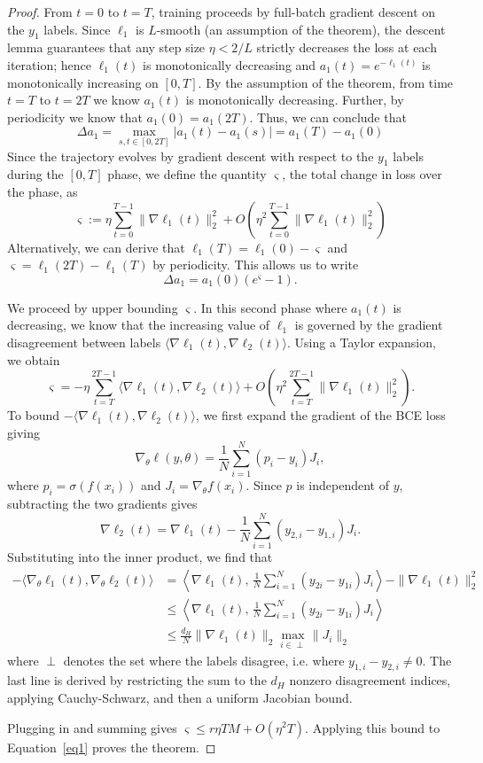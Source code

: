 \documentclass[pmlr]{jmlr} %
\begin{document}
\begin{proof}
From $t=0$ to $t=T$, training proceeds by full-batch gradient descent on the $y_1$ labels. Since $\ell_1$ is $L$-smooth (an assumption of the theorem), the descent lemma guarantees that any step size $\eta < 2/L$ strictly decreases the loss at each iteration; hence $\ell_1(t)$ is monotonically decreasing and $a_1(t)=e^{-\ell_1(t)}$ is monotonically increasing on $[0,T]$. By the assumption of the theorem, from time $t=T$ to $t=2T$ we know $a_1(t)$ is monotonically decreasing. Further, by periodicity we know that $a_1(0)=a_1(2T)$. Thus, we can conclude that
\[
    \Delta a_1 = \max_{s,t \in [0,2T]}|a_1(t)-a_1(s)|=a_1(T)-a_1(0)
\]
Since the trajectory evolves by gradient descent with respect to the $y_1$ labels during the $[0,T]$ phase, we define the quantity $\varsigma$, the total change in loss over the phase, as
\[
\varsigma := \eta \sum_{t=0}^{T-1}\|\nabla\ell_1(t)\|_2^2 + O\left( \eta^2 \sum_{t=0}^{T-1}\|\nabla\ell_1(t)\|_2^2 \right)
\]
Alternatively, we can derive that $\ell_1(T)=\ell_1(0)-\varsigma$ and 
$\varsigma  =\ell_1(2T)-\ell_1(T)$ by periodicity. This allows us to write 
\begin{equation}
\label{eq1}
\Delta a_1=a_1(0)(e^\varsigma - 1).
\end{equation}

We proceed by upper bounding $\varsigma$. In this second phase where $a_1(t)$ is decreasing, we know that the increasing value of $\ell_1$ is governed by the gradient disagreement between labels $\langle \nabla\ell_1(t),\nabla \ell_2(t) \rangle$. Using a Taylor expansion, we obtain
\[
\varsigma=-\eta \sum_{t=T}^{2T-1}\langle \nabla\ell_1(t),\nabla \ell_2(t) \rangle + O\left( \eta^2 \sum_{t=T}^{2T-1}\|\nabla\ell_1(t)\|_2^2 \right).
\]
To bound $-\langle \nabla\ell_1(t),\nabla \ell_2(t) \rangle$, we first expand the gradient of the BCE loss giving
\[
    \nabla_\theta \ell(y,\theta)= \frac{1}{N}\sum_{i=1}^N(p_i-y_i)J_i,
\]
where $p_i=\sigma(f(x_i))$ and $J_i=\nabla_\theta f(x_i)$. Since $p$ is independent of $y$, subtracting the two gradients gives
\[
\nabla\ell_2(t)=\nabla\ell_1(t)-\frac{1}{N} \sum_{i=1}^N (y_{2,i}-y_{1,i})J_i.
\]
Substituting into the inner product, we find that
\begin{align}
-\langle\nabla_\theta\ell_1(t),\nabla_\theta\ell_2(t)\rangle
&= \left\langle\nabla\ell_1(t),\,\frac{1}{N}\sum_{i=1}^N(y_{2i}-y_{1i})J_i\right\rangle - \|\nabla \ell_1(t)\|_2^2\\
&\le \left\langle\nabla\ell_1(t),\,\frac{1}{N}\sum_{i=1}^N(y_{2i}-y_{1i})J_i\right\rangle\\
&\le \frac{d_H}{N}\|\nabla \ell_{1}(t)\|_{2} \max_{i\in\perp} \|J_i\|_2
\end{align}
where $\perp$ denotes the set where the labels disagree, i.e. where $y_{1,i}-y_{2,i} \ne 0$. The last line is derived by restricting the sum to the $d_H$ nonzero disagreement indices, applying Cauchy-Schwarz, and then a uniform Jacobian bound. 

Plugging in and summing gives $\varsigma \le r\eta T M + O(\eta^2T)$. Applying this bound to Equation~\ref{eq1} proves the theorem.
\end{proof}
\end{document}
